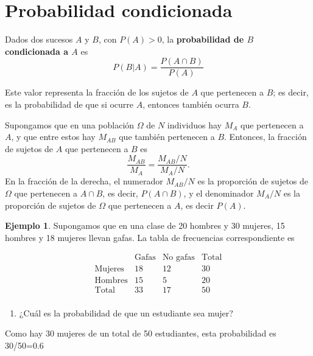 \documentclass[
]{book}
\providecommand{\tightlist}{%
  \setlength{\itemsep}{0pt}\setlength{\parskip}{0pt}}
\theoremstyle{definition}
\theoremstyle{definition}
\newtheorem{example}{Ejemplo}[chapter]
\theoremstyle{definition}
\theoremstyle{definition}
\theoremstyle{remark}
\begin{document}
\hypertarget{probabilidad-condicionada}{%
\section{Probabilidad condicionada}\label{probabilidad-condicionada}}

Dados dos sucesos \(A\) y \(B\), con \(P(A)>0\), la \textbf{probabilidad de \(B\) condicionada a \(A\)} es
\[
P(B|A)=\frac{P(A\cap B)}{P(A)}
\]

Este valor representa la fracción de los sujetos de \(A\) que pertenecen a \(B\); es decir, es la probabilidad de que si ocurre \(A\), entonces también ocurra \(B\).

\begin{rmdnote}
Supongamos que en una población \(\Omega\) de \(N\) individuos hay \(M_A\) que pertenecen a \(A\), y que entre estos hay \(M_{\textit{AB}}\) que también pertenecen a \(B\). Entonces, la fracción de sujetos de \(A\) que pertenecen a \(B\) es
\[
\frac{M_{\textit{AB}}}{M_A}=\frac{M_{\textit{AB}}/N}{M_A/N}.
\]
En la fracción de la derecha, el numerador \(M_{\textit{AB}}/N\) es la proporción de sujetos de \(\Omega\) que pertenecen a \(A\cap B\), es decir, \(P(A\cap B)\), y el denominador \(M_A/N\) es la proporción de sujetos de \(\Omega\) que pertenecen a \(A\), es decir \(P(A)\).
\end{rmdnote}

\begin{example}
\protect\hypertarget{exm:mujergafas}{}\label{exm:mujergafas}Supongamos que en una clase de 20 hombres y 30 mujeres, 15 hombres y 18 mujeres llevan gafas. La tabla de frecuencias correspondiente es
\end{example}

\[
\begin{array}{r|c|c|c}
& \text{Gafas} & \text{No gafas} & \text{Total}\\ \hline
\text{Mujeres} & 18 &12  & 30\\ \hline
\text{Hombres} & 15 & 5 & 20 \\ \hline
\text{Total} & 33 & 17 &  50 \\ 
\end{array}
\]

\begin{enumerate}
\def\labelenumi{\arabic{enumi}.}
\tightlist
\item
  ¿Cuál es la probabilidad de que un estudiante sea mujer?
\end{enumerate}

Como hay 30 mujeres de un total de 50 estudiantes, esta probabilidad es 30/50=0.6
\end{document}
